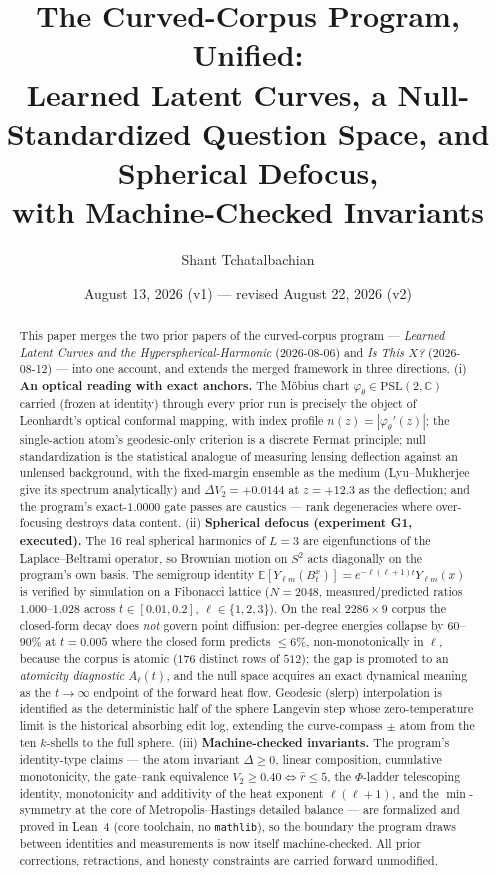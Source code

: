 \documentclass[11pt,a4paper]{article}
\title{The Curved-Corpus Program, Unified:\\
{\large Learned Latent Curves, a Null-Standardized Question Space, and Spherical Defocus,\\ with Machine-Checked Invariants}}
\author{Shant Tchatalbachian}
\date{August 13, 2026 (v1) --- revised August 22, 2026 (v2)}
\theoremstyle{plain}
\theoremstyle{remark}
\begin{document}
\maketitle

\begin{abstract}
This paper merges the two prior papers of the curved-corpus program --- \emph{Learned Latent Curves and the Hyperspherical-Harmonic} (2026-08-06) and \emph{Is This $X$?} (2026-08-12) --- into one account, and extends the merged framework in three directions. (i) \textbf{An optical reading with exact anchors.} The M\"obius chart $\varphi_\theta\in\mathrm{PSL}(2,\mathbb{C})$ carried (frozen at identity) through every prior run is precisely the object of Leonhardt's optical conformal mapping, with index profile $n(z)=|\varphi_\theta'(z)|$; the single-action atom's geodesic-only criterion is a discrete Fermat principle; null standardization is the statistical analogue of measuring lensing deflection against an unlensed background, with the fixed-margin ensemble as the medium (Lyu--Mukherjee give its spectrum analytically) and $\Delta V_2=+0.0144$ at $z=+12.3$ as the deflection; and the program's exact-$1.0000$ gate passes are caustics --- rank degeneracies where over-focusing destroys data content. (ii) \textbf{Spherical defocus (experiment G1, executed).} The 16 real spherical harmonics of $L=3$ are eigenfunctions of the Laplace--Beltrami operator, so Brownian motion on $S^2$ acts diagonally on the program's own basis. The semigroup identity $\mathbb{E}[Y_{\ell m}(B_t^x)]=e^{-\ell(\ell+1)t}Y_{\ell m}(x)$ is verified by simulation on a Fibonacci lattice ($N{=}2048$, measured/predicted ratios $1.000$--$1.028$ across $t\in[0.01,0.2]$, $\ell\in\{1,2,3\}$). On the real $2286\times9$ corpus the closed-form decay does \emph{not} govern point diffusion: per-degree energies collapse by $60$--$90\%$ at $t=0.005$ where the closed form predicts $\le6\%$, non-monotonically in $\ell$, because the corpus is atomic ($176$ distinct rows of $512$); the gap is promoted to an \emph{atomicity diagnostic} $A_\ell(t)$, and the null space acquires an exact dynamical meaning as the $t\to\infty$ endpoint of the forward heat flow. Geodesic (slerp) interpolation is identified as the deterministic half of the sphere Langevin step whose zero-temperature limit is the historical absorbing edit log, extending the curve-compass $\pm$ atom from the ten $k$-shells to the full sphere. (iii) \textbf{Machine-checked invariants.} The program's identity-type claims --- the atom invariant $\Delta\ge0$, linear composition, cumulative monotonicity, the gate--rank equivalence $V_2\ge0.40\iff\hat r\le5$, the $\Phi$-ladder telescoping identity, monotonicity and additivity of the heat exponent $\ell(\ell+1)$, and the $\min$-symmetry at the core of Metropolis--Hastings detailed balance --- are formalized and proved in Lean~4 (core toolchain, no \texttt{mathlib}), so the boundary the program draws between identities and measurements is now itself machine-checked. All prior corrections, retractions, and honesty constraints are carried forward unmodified.
\end{abstract}
\end{document}
